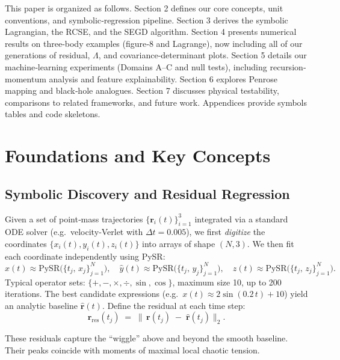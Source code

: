 \documentclass[11pt]{article}
\newcommand{\Leak}{\Lambda}
\begin{document}
This paper is organized as follows. Section 2 defines our core concepts, unit conventions, and symbolic‐regression pipeline. Section 3 derives the symbolic Lagrangian, the RCSE, and the SEGD algorithm. Section 4 presents numerical results on three‐body examples (figure‐8 and Lagrange), now including all of our generations of residual, \(\Leak\), and covariance‐determinant plots. Section 5 details our machine‐learning experiments (Domains A–C and null tests), including recursion‐momentum analysis and feature explainability. Section 6 explores Penrose mapping and black‐hole analogues. Section 7 discusses physical testability, comparisons to related frameworks, and future work. Appendices provide symbols tables and code skeletons.

\section{Foundations and Key Concepts}

\subsection{Symbolic Discovery and Residual Regression}
Given a set of point‐mass trajectories \(\{\bm r_i(t)\}_{i=1}^3\) integrated via a standard ODE solver (e.g.\ velocity‐Verlet with \(\Delta t=0.005\)), we first \emph{digitize} the coordinates \(\{x_i(t),y_i(t),z_i(t)\}\) into arrays of shape \((N,3)\). We then fit each coordinate independently using PySR:
\[
  \hat{x}(t)\approx \mathrm{PySR}\bigl(\{t_j,\,x_j\}_{j=1}^N\bigr),\quad
  \hat{y}(t)\approx \mathrm{PySR}\bigl(\{t_j,\,y_j\}_{j=1}^N\bigr),\quad
  \hat{z}(t)\approx \mathrm{PySR}\bigl(\{t_j,\,z_j\}_{j=1}^N\bigr).
\]
Typical operator sets: \(\{+, -, \times, \div, \sin, \cos\}\), maximum size 10, up to 200 iterations. The best candidate expressions (e.g.\ \(x(t)\approx 2\sin(0.2\,t)+10\)) yield an analytic baseline \(\hat{\bm r}(t)\). Define the residual at each time step:
\[
  \bm r_{\mathrm{res}}(t_j) \;=\; \bigl\lVert\,\bm r(t_j) \;-\; \hat{\bm r}(t_j)\bigr\rVert_{2}.
\]
\FloatBarrier  %

These residuals capture the “wiggle” above and beyond the smooth baseline.  
Their peaks coincide with moments of maximal local chaotic tension.
\par\vspace{1em}
\end{document}
